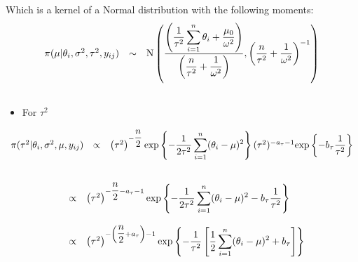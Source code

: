 \documentclass[a4paper, 11pt]{article}
\begin{document}
Which is a kernel of a Normal distribution with the following moments:\\
\begin{equation*}
\begin{array}{lcl ll }

\pi(\mu|\theta_i, \sigma^2, \tau^2, y_{ij}) & \sim &  \mbox{N} \left( \dfrac{ \left(\dfrac{1}{\tau^2}\displaystyle\sum_{i=1}^{n} \theta_i + \dfrac{\mu_0}{\omega^2} \right)}{\left( \dfrac{n}{\tau^2} +\dfrac{1}{\omega^2} \right)}, \left( \dfrac{n}{\tau^2} +\dfrac{1}{\omega^2} \right)^{-1} \right) \\\\

 \end{array}
\end{equation*}


\begin{itemize}
\item For $\tau^2$
\end{itemize}
\begin{equation*}
\begin{array}{lcl ll }

\pi(\tau^2| \theta_i, \sigma^2, \mu, y_{ij}) & \propto & \left(\tau^2\right)^{-\dfrac{n}{2}}\mbox{exp}\left\{ - \dfrac{1}{2\tau^2} 
\displaystyle\sum_{i=1}^{n} (\theta_i - \mu)^2\right\} (\tau^2)^{-a_\tau-1} \mbox{exp}\left\{ - b_\tau\dfrac{1}{\tau^2}\right\} \\ \\

 \end{array}
\end{equation*}


\begin{equation*}
\begin{array}{lcl ll }
& \propto & \left(\tau^2\right)^{-\dfrac{n}{2}-a_\tau-1}\mbox{exp}\left\{ - \dfrac{1}{2\tau^2} 
\displaystyle\sum_{i=1}^{n} (\theta_i - \mu)^2 - b_\tau\dfrac{1}{\tau^2}\right\} \\ \\

& \propto & \left(\tau^2\right)^{-\left(\dfrac{n}{2}+a_\tau\right)-1}\mbox{exp}\left\{ - \dfrac{1}{\tau^2} \left[\dfrac{1}{2}
\displaystyle\sum_{i=1}^{n} (\theta_i - \mu)^2 + b_\tau\right]\right\} \\ \\

 \end{array}
\end{equation*}
\end{document}
